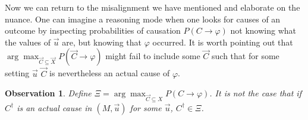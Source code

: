 \documentclass{article}
\newtheorem{observation}[theorem]{Observation}
\begin{document}
\newpage

Now we can return to the misalignment we have mentioned and elaborate on the nuance. One can imagine a reasoning mode when one looks for causes of an outcome by inspecting probabilities of causation $P(C \rightarrow \varphi)$ not knowing what the values of $\vec{u}$ are, but knowing that $\varphi$ occurred. It is worth pointing out that  $\arg\max_{\vec{C} \subseteq \vec{X}}P(\vec{C} \rightarrow \varphi)$ might fail to include some $\vec{C}$ such that for some setting $\vec{u}$ $\vec{C}$ is nevertheless an actual cause of $\varphi$.


\begin{observation} Define $\Xi = \arg\max_{\vec{C} \subseteq {X}} P(C \rightarrow \varphi)$. It is not the case that if $C^\dagger$ is an actual cause in $(M, \vec{u})$ for some $\vec{u}$, $C^\dagger \in \Xi$.
\end{observation}
\end{document}
